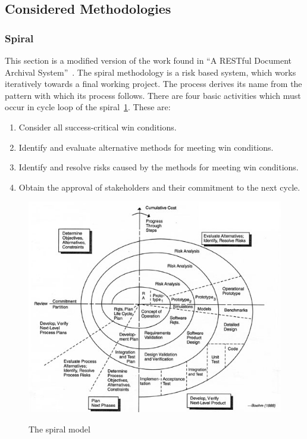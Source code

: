 \documentclass[11pt,a4paper]{article}
\begin{document}
\subsection{Considered Methodologies}
\label{sec:considered-methods}
\subsubsection{Spiral}
This section is a modified version of the work found in ``A RESTful Document Archival System''~\cite{restWeb}. The spiral methodology is a risk based system, which works iteratively towards a final working project. The process derives its name from the pattern with which its process follows. There are four basic activities which must occur in cycle loop of the spiral~\ref{fig:spiral}. These are:

\begin{enumerate}
  \item Consider all success-critical win conditions.
  \item Identify and evaluate alternative methods for meeting win conditions.
  \item Identify and resolve risks caused by the methods for meeting win conditions. 
  \item Obtain the approval of stakeholders and their commitment to the next cycle. 
\end{enumerate}

\begin{figure}[H]
\begin{center}
\includegraphics[scale=2.5]{spiral.jpeg}
\label{fig:spiral}
\caption{The spiral model \cite{spiral}}
\end{center}
\end{figure}
\end{document}
